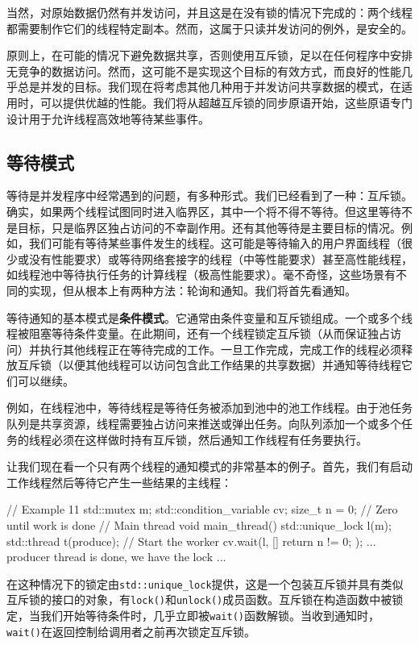 当然，对原始数据仍然有并发访问，并且这是在没有锁的情况下完成的：两个线程都需要制作它们的线程特定副本。然而，这属于只读并发访问的例外，是安全的。

原则上，在可能的情况下避免数据共享，否则使用互斥锁，足以在任何程序中安排无竞争的数据访问。然而，这可能不是实现这个目标的有效方式，而良好的性能几乎总是并发的目标。我们现在将考虑其他几种用于并发访问共享数据的模式，在适用时，可以提供优越的性能。我们将从超越互斥锁的同步原语开始，这些原语专门设计用于允许线程高效地等待某些事件。

\subsection{等待模式}

等待是并发程序中经常遇到的问题，有多种形式。我们已经看到了一种：互斥锁。确实，如果两个线程试图同时进入临界区，其中一个将不得不等待。但这里等待不是目标，只是临界区独占访问的不幸副作用。还有其他等待是主要目标的情况。例如，我们可能有等待某些事件发生的线程。这可能是等待输入的用户界面线程（很少或没有性能要求）或等待网络套接字的线程（中等性能要求）甚至高性能线程，如线程池中等待执行任务的计算线程（极高性能要求）。毫不奇怪，这些场景有不同的实现，但从根本上有两种方法：轮询和通知。我们将首先看通知。

等待通知的基本模式是\textbf{条件模式}。它通常由条件变量和互斥锁组成。一个或多个线程被阻塞等待条件变量。在此期间，还有一个线程锁定互斥锁（从而保证独占访问）并执行其他线程正在等待完成的工作。一旦工作完成，完成工作的线程必须释放互斥锁（以便其他线程可以访问包含此工作结果的共享数据）并通知等待线程它们可以继续。

例如，在线程池中，等待线程是等待任务被添加到池中的池工作线程。由于池任务队列是共享资源，线程需要独占访问来推送或弹出任务。向队列添加一个或多个任务的线程必须在这样做时持有互斥锁，然后通知工作线程有任务要执行。

让我们现在看一个只有两个线程的通知模式的非常基本的例子。首先，我们有启动工作线程然后等待它产生一些结果的主线程：

\begin{code}
// Example 11
std::mutex m;
std::condition_variable cv;
size_t n = 0;               // Zero until work is done
// Main thread
void main_thread() {
  std::unique_lock l(m);
  std::thread t(produce);     // Start the worker
  cv.wait(l, []{ return n != 0; });
  ... producer thread is done, we have the lock ...
}
\end{code}

在这种情况下的锁定由\texttt{std::unique\_lock}提供，这是一个包装互斥锁并具有类似互斥锁的接口的对象，有\texttt{lock()}和\texttt{unlock()}成员函数。互斥锁在构造函数中被锁定，当我们开始等待条件时，几乎立即被\texttt{wait()}函数解锁。当收到通知时，\texttt{wait()}在返回控制给调用者之前再次锁定互斥锁。

